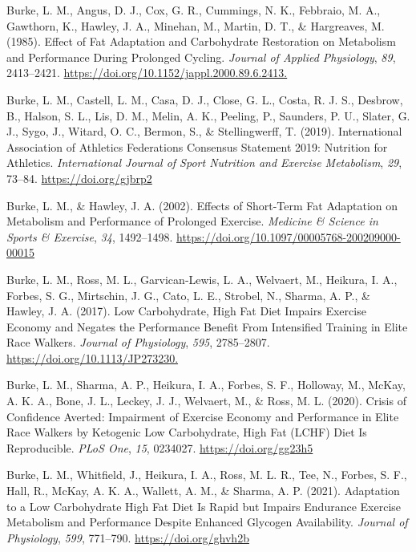 \documentclass[]{cik}%
\newlength{\cslhangindent}
\newlength{\cslentryspacingunit} %
\newenvironment{CSLReferences}[2] %
 {%
  \setlength{\parindent}{0pt}
  \ifodd #1
  \let\oldpar\par
  \def\par{\hangindent=\cslhangindent\oldpar}
  \fi
  \setlength{\parskip}{#2\cslentryspacingunit}
 }%
 {}
\begin{document}
\begin{CSLReferences}{1}{0}
\leavevmode{}%
Burke, L. M., Angus, D. J., Cox, G. R., Cummings, N. K., Febbraio, M.
A., Gawthorn, K., Hawley, J. A., Minehan, M., Martin, D. T., \&
Hargreaves, M. (1985). Effect of Fat Adaptation and Carbohydrate
Restoration on Metabolism and Performance During Prolonged Cycling.
\emph{Journal of Applied Physiology}, \emph{89}, 2413--2421.
\url{https://doi.org/10.1152/jappl.2000.89.6.2413.}

\leavevmode{}%
Burke, L. M., Castell, L. M., Casa, D. J., Close, G. L., Costa, R. J.
S., Desbrow, B., Halson, S. L., Lis, D. M., Melin, A. K., Peeling, P.,
Saunders, P. U., Slater, G. J., Sygo, J., Witard, O. C., Bermon, S., \&
Stellingwerff, T. (2019). International Association of Athletics
Federations Consensus Statement 2019: Nutrition for Athletics.
\emph{International Journal of Sport Nutrition and Exercise Metabolism},
\emph{29}, 73--84. \url{https://doi.org/gjbrp2}

\leavevmode{}%
Burke, L. M., \& Hawley, J. A. (2002). Effects of Short-Term Fat
Adaptation on Metabolism and Performance of Prolonged Exercise.
\emph{Medicine \& Science in Sports \& Exercise}, \emph{34}, 1492--1498.
\url{https://doi.org/10.1097/00005768-200209000-00015}

\leavevmode{}%
Burke, L. M., Ross, M. L., Garvican‐Lewis, L. A., Welvaert, M., Heikura,
I. A., Forbes, S. G., Mirtschin, J. G., Cato, L. E., Strobel, N.,
Sharma, A. P., \& Hawley, J. A. (2017). Low Carbohydrate, High Fat Diet
Impairs Exercise Economy and Negates the Performance Benefit From
Intensified Training in Elite Race Walkers. \emph{Journal of
Physiology}, \emph{595}, 2785--2807.
\url{https://doi.org/10.1113/JP273230.}

\leavevmode{}%
Burke, L. M., Sharma, A. P., Heikura, I. A., Forbes, S. F., Holloway,
M., McKay, A. K. A., Bone, J. L., Leckey, J. J., Welvaert, M., \& Ross,
M. L. (2020). Crisis of Confidence Averted: Impairment of Exercise
Economy and Performance in Elite Race Walkers by Ketogenic Low
Carbohydrate, High Fat (LCHF) Diet Is Reproducible. \emph{PLoS One},
\emph{15}, 0234027. \url{https://doi.org/gg23h5}

\leavevmode{}%
Burke, L. M., Whitfield, J., Heikura, I. A., Ross, M. L. R., Tee, N.,
Forbes, S. F., Hall, R., McKay, A. K. A., Wallett, A. M., \& Sharma, A.
P. (2021). Adaptation to a Low Carbohydrate High Fat Diet Is Rapid but
Impairs Endurance Exercise Metabolism and Performance Despite Enhanced
Glycogen Availability. \emph{Journal of Physiology}, \emph{599},
771--790. \url{https://doi.org/ghvh2b}


\end{CSLReferences}
\end{document}
